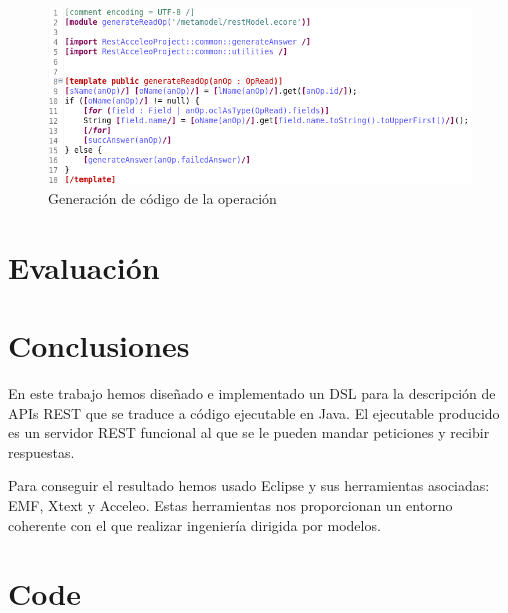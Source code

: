 \documentclass[runningheads]{llncs}
\begin{document}
\begin{figure}
    \centering
    \includegraphics[width=\textwidth]{generateReadOp}
    \caption{Generación de código de la operación \READ}
    \label{fig:gen-read}
\end{figure}

\section{Evaluación}
\label{sc:eval}




\section{Conclusiones}
\label{sc:concl}

En este trabajo hemos diseñado e implementado un DSL para la descripción
de APIs REST que se traduce a código ejecutable en Java. El ejecutable
producido es un servidor REST funcional al que se le pueden mandar
peticiones y recibir respuestas.

Para conseguir el resultado hemos usado Eclipse y sus herramientas
asociadas: EMF, Xtext y Acceleo. Estas herramientas nos proporcionan un
entorno coherente con el que realizar ingeniería dirigida por modelos.

\newpage

\appendix
\section{Code}
\label{app:codigo-inicial}
\end{document}
